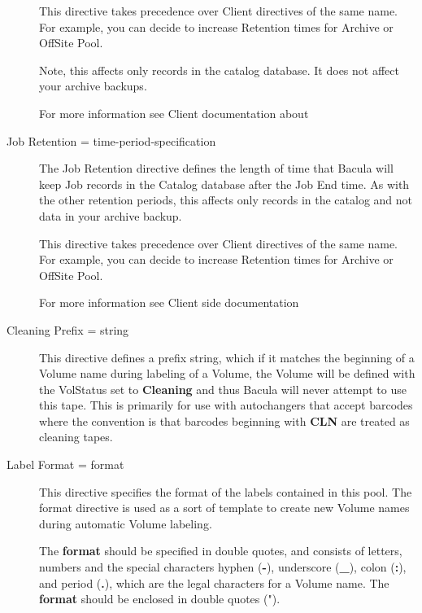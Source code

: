 \begin{description}
   This directive takes precedence over Client directives of the same name. For
   example, you can decide to increase Retention times for Archive or OffSite
   Pool.

   Note, this affects only records in the catalog database. It does not affect
   your archive backups.

   For more information see Client documentation about

\item [Job Retention = \lt{}time-period-specification\gt{}]

   The Job Retention directive defines the length of time that Bacula will keep
   Job records in the Catalog database after the Job End time.  As with the
   other retention periods, this affects only records in the catalog and not
   data in your archive backup.

   This directive takes precedence over Client directives of the same name.
   For example, you can decide to increase Retention times for Archive or
   OffSite Pool.

   For more information see Client side documentation

\item [Cleaning Prefix = \lt{}string\gt{}]
   This directive defines a prefix string, which if it matches the
   beginning of a Volume name during labeling of a Volume, the Volume will
   be defined with the VolStatus set to {\bf Cleaning} and thus Bacula will
   never attempt to use this tape.  This is primarily for use with
   autochangers that accept barcodes where the convention is that barcodes
   beginning with {\bf CLN} are treated as cleaning tapes.

\label{Label}
\item [Label Format = \lt{}format\gt{}]
   This directive specifies the format of the labels contained in this
   pool.  The format directive is used as a sort of template to create new
   Volume names during automatic Volume labeling.

   The {\bf format} should be specified in double quotes, and consists of
   letters, numbers and the special characters hyphen ({\bf -}), underscore
   ({\bf \_}), colon ({\bf :}), and period ({\bf .}), which are the legal
   characters for a Volume name.  The {\bf format} should be enclosed in
   double quotes (").


\end{description}
